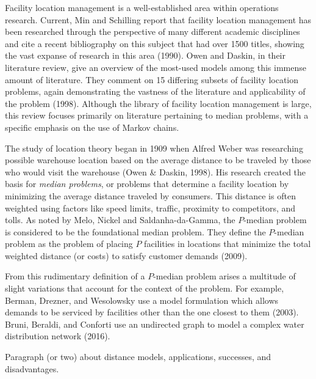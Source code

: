 \documentclass[twoside,twocolumn]{article}
\begin{document}
Facility location management is a well-established area within operations research. %
Current, Min and Schilling report that facility location management has been researched through the perspective of many different academic disciplines and cite a recent bibliography on this subject that had over 1500 titles, showing the vast expanse of research in this area (1990). %
Owen and Daskin, in their literature review, give an overview of the most-used models among this immense amount of literature.
They comment on 15 differing subsets of facility location problems, again demonstrating the vastness of the literature and applicability of the problem (1998).
Although the library of facility location management is large, this review focuses primarily on literature pertaining to median problems, with a specific emphasis on the use of Markov chains. %

The study of location theory began in 1909 when Alfred Weber was researching possible warehouse location based on the average distance to be traveled by those who would visit the warehouse (Owen \& Daskin, 1998).
His research created the basis for {\em median problems}, or problems that determine a facility location by minimizing the average distance traveled by consumers.
This distance is often weighted using factors like speed limits, traffic, proximity to competitors, and tolls. %
As noted by Melo, Nickel and Saldanha-da-Gamma, the $P$-median problem is considered to be the foundational median problem.
They define the $P$-median problem as the problem of placing $P$ facilities in locations that minimize the total weighted distance (or costs) to satisfy customer demands (2009).

From this rudimentary definition of a $P$-median problem arises a multitude of slight variations that account for the context of the problem.
For example, Berman, Drezner, and Wesolowsky use a model formulation which allows demands to be serviced by facilities other than the one closest to them (2003).
Bruni, Beraldi, and Conforti use an undirected graph to model a complex water distribution network (2016).

Paragraph (or two) about distance models, applications, successes, and disadvantages.
\end{document}

